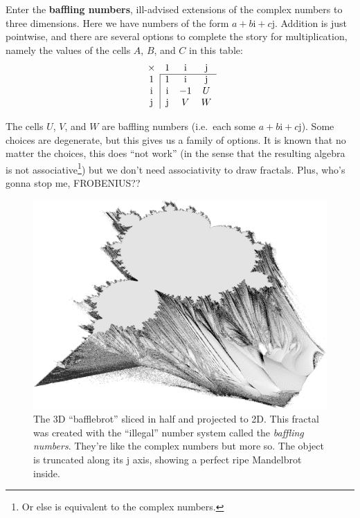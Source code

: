 \documentclass[twocolumn]{article}
\begin{document}
Enter the {\bf baffling numbers}, ill-advised extensions of the
complex numbers to three dimensions. Here we have numbers of the form
$a + b\mathrm{i} + c\mathrm{j}$. Addition is just pointwise, and there
are several options to complete the story for multiplication, namely
the values of the cells $A$, $B$, and $C$ in this table:
%
\[
\begin{array}{c|ccc}
  \multicolumn{1}{c}{\times} & 1          &  \mathrm{i} & \mathrm{j} \\
  \cline{2-4}
  1          & 1          &  \mathrm{i} & \mathrm{j} \\
  \mathrm{i} & \mathrm{i} & -1          & U \\
  \mathrm{j} & \mathrm{j} &  V          & W \\
\end{array}
\]




The cells $U$, $V$, and $W$ are baffling numbers (i.e.~each some
$a + b\mathrm{i} + c\mathrm{j}$). Some choices are
degenerate, but this gives us a family of options. It is known that no
matter the choices, this does ``not work'' (in the sense that the
resulting algebra is not associative\footnote{Or else is equivalent to
  the complex numbers.}) but we don't need associativity to draw
fractals. Plus, who's gonna stop me, FROBENIUS??

\begin{figure}[tp]
  \begin{center}
    \includegraphics[width=0.95 \linewidth]{bafflebrot}
  \end{center}
  \caption{
    The 3D ``bafflebrot'' sliced in half and projected to 2D.
    This fractal was created with the ``illegal'' number system
    called the {\it baffling numbers}. They're like the complex
    numbers but more so. The object is truncated along its
    $\textrm{j}$ axis, showing a perfect ripe Mandelbrot inside.
  } \label{fig:bafflebrot}
\end{figure}
\end{document}
